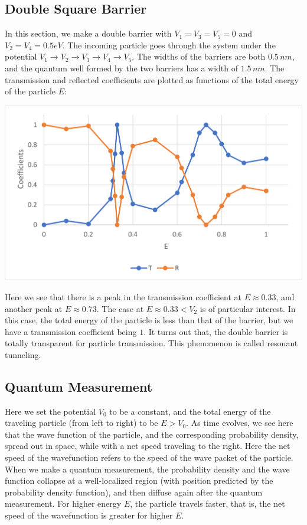 \documentclass[11pt]{book}
\theoremstyle{break}
\theoremstyle{break}
\begin{document}
\subsection{Double Square Barrier}
In this section, we make a double barrier with $V_1 = V_3 = V_5 = 0$ and $V_2 = V_4 = 0.5 eV$.  The incoming particle goes through the system under the potential $V_1\to V_2 \to V_3\to V_4\to V_5$. The widths of the barriers are both $0.5\, nm$, and the quantum well formed by the two barriers has a width of $1.5\, nm$. The transmission and reflected coefficients are plotted as functions of the total energy of the particle $E$:
\begin{center}
\includegraphics[scale=1.19]{DoubleBar}
\end{center}
Here we see that there is a peak in the transmission coefficient at $E \approx 0.33$, and another peak at $E \approx 0.73$. The case at $E\approx 0.33 < V_2$ is of particular interest. In this case, the total energy of the particle is less than that of the barrier, but we have a transmission coefficient being $1$. It turns out that, the double barrier is totally transparent for particle transmission. This phenomenon is called resonant tunneling.

\subsection{Quantum Measurement}
Here we set the potential $V_0$ to be a constant, and the total energy of the traveling particle (from left to right) to be $E>V_0$. As time evolves, we see here that the wave function of the particle, and the corresponding probability density, spread out in space, while with a net speed traveling to the right. Here the net speed of the wavefunction refers to the speed of the wave packet of the particle. When we make a quantum measurement, the probability density and the wave function collapse at a well-localized region (with position predicted by the probability density function), and then diffuse again after the quantum measurement. For higher energy $E$, the particle travels faster, that is, the net speed of the wavefunction is greater for higher $E$. 
\end{document}
